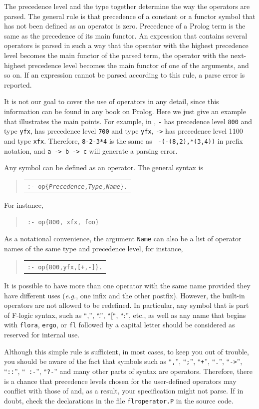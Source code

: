 \documentclass[11pt]{article}
\newcommand{\ERGO}{\mbox{\smaller{\ensuremath{\cal{E}}\smaller{{\sc{RGO}}}}}\xspace}
\newcommand{\FLSYSTEM}{\ERGO}
\newenvironment{qrules}{\begin{quote}\tt\begin{tabular}[t]{l}}%
{\end{tabular}\end{quote}}
\newcommand{\fl}{\mbox{F-logic}\xspace}
\begin{document}
The precedence level and the type together determine the way the operators
are parsed. The general rule is that precedence of a constant or a functor
symbol that has not been defined as an operator is zero. Precedence of a
Prolog term is the same as the precedence of its main functor. 
An expression that contains several operators is parsed in such a way that
the operator with the highest precedence level becomes the main functor of
the parsed term, the operator with the next-highest precedence
level becomes the main functor of one of the arguments, and so on.
If an expression cannot be parsed according to this rule, a parse error is
reported.

It is not our goal to cover the use of operators in any detail, since this
information can be found in any book on Prolog. Here we just give an
example that illustrates the main points.  For example, in \FLSYSTEM, {\tt -}
has precedence level {\tt 800} and type {\tt yfx}, {\tt *} has precedence
level {\tt 700} and type {\tt yfx}, {\tt ->} has precedence level 1100 and
type {\tt xfx}.  Therefore, {\tt 8-2-3*4} is the same as {\tt
  -(-(8,2),*(3,4))} in prefix notation, and {\tt a -> b -> c} will generate
a parsing error.


%
Any symbol can be defined as an operator. The general syntax is
\begin{qrules}
{\tt :- op\{\emph{Precedence},\emph{Type},\emph{Name}\}.}
\end{qrules}
For instance, 
\begin{quote}
 {\tt
   :- op\{800, xfx, foo\}
   }
\end{quote}
As a notational convenience, the argument {\tt Name} can also be a list of
operator names of the same type and precedence level, for instance,
\begin{qrules}
{\tt :- op\{800,yfx,[+,-]\}.}
\end{qrules}
It is possible to have more than one operator with the same name provided
they have different uses ({\it e.g.}, one infix and the other postfix).
However, the \FLSYSTEM built-in operators are not allowed to be redefined.
In particular, any symbol that is part of \fl syntax, such as ``,'', ``.'',
``[``, ``:'', etc., as well as any name that begins with {\tt flora},
\texttt{ergo},  or
{\tt fl} followed by a capital letter should be considered as reserved for
internal use.

Although this simple rule is sufficient, in most cases, to keep you out of
trouble, you should be aware of the fact that symbols such as ``{\tt ,}'',
``{\tt ;}'', ``{\tt +}'', ``{\tt .}'', ``{\tt ->}'', ``{\tt ::}'', ``{\tt
  :-}'', ``{\tt ?-}'' and many
other parts of \FLSYSTEM syntax are operators. Therefore, there is a chance
that precedence levels chosen for the user-defined operators may conflict with
those of \FLSYSTEM and, as a result, your specification might not parse. If in
doubt, check the declarations in the file {\tt flroperator.P} in the \FLSYSTEM
source code.
\end{document}
